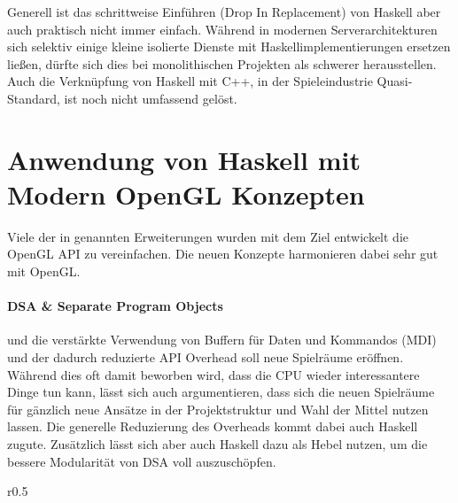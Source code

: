 Generell ist das schrittweise Einführen (Drop In Replacement) von Haskell aber auch praktisch nicht immer einfach. Während in modernen Serverarchitekturen sich selektiv einige kleine isolierte Dienste mit Haskellimplementierungen ersetzen ließen, dürfte sich dies bei monolithischen Projekten als schwerer herausstellen. Auch die Verknüpfung von Haskell mit C++, in der Spieleindustrie Quasi-Standard, ist noch nicht umfassend gelöst.


\begingroup
\setlength\intextsep{0pt}
\section{Anwendung von Haskell mit Modern OpenGL Konzepten}

Viele der in  genannten Erweiterungen wurden mit dem Ziel entwickelt die OpenGL API zu vereinfachen. Die neuen Konzepte harmonieren dabei sehr gut mit OpenGL.

\paragraph{\acl{DSA} \& Separate Program Objects} und die verstärkte Verwendung von Buffern für Daten und Kommandos (\ac{MDI}) und der dadurch reduzierte API Overhead soll neue Spielräume eröffnen. Während dies oft damit beworben wird, dass die CPU wieder interessantere Dinge tun kann, lässt sich auch argumentieren, dass sich die neuen Spielräume für gänzlich neue Ansätze in der Projektstruktur und Wahl der Mittel nutzen lassen. Die generelle Reduzierung des Overheads kommt dabei auch Haskell zugute. Zusätzlich lässt sich aber auch Haskell dazu als Hebel nutzen, um die bessere Modularität von \ac{DSA} voll auszuschöpfen.

\begin{wrapfigure}{r}{0.5\linewidth}
\centering
{}
\end{wrapfigure}

